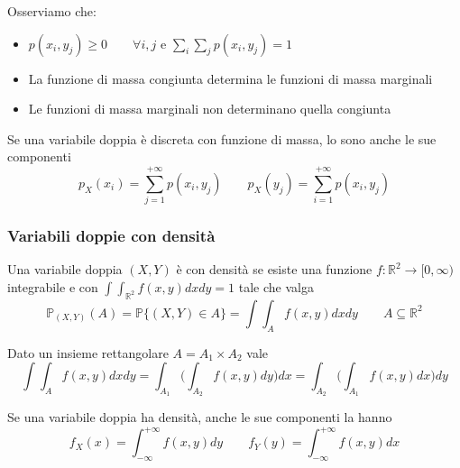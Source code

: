 \begin{observation}
	Osserviamo che:
	\begin{itemize}
		\item $p(x_i,y_j) \geq 0 \qquad \forall i,j$ e $\sum_{i}\sum_jp(x_i,y_j)=1$
		\item La funzione di massa congiunta determina le funzioni di massa marginali
		\item Le funzioni di massa marginali non determinano quella congiunta
	\end{itemize}
\end{observation}

\begin{proposition}
	Se una variabile doppia è discreta con funzione di massa, lo sono anche le sue componenti
	\begin{equation}
		p_X(x_i) = \sum_{j=1}^{+\infty} p(x_i,y_j) \quad\quad p_X(y_j) = \sum_{i=1}^{+\infty} p(x_i,y_j)
	\end{equation}
\end{proposition}
\subsubsection{Variabili doppie con densità}
Una variabile doppia $(X,Y)$ è con densità se esiste una funzione $f : \mathbb{R}^2 \to [0,\infty)$ integrabile e con $\int\int_{\mathbb{R}^2}f(x,y)dxdy=1$ tale che valga
\begin{equation}
	\mathbb{P}_{(X,Y)}(A) = \mathbb{P}\{(X,Y) \in A\} = \int\int_A f(x,y) dxdy \quad\quad A \subseteq \mathbb{R}^2
\end{equation}

\begin{theorem}
	Dato un insieme rettangolare $A = A_1 \times A_2$ vale
	\begin{equation}
		\int\int_A f(x,y)dxdy = \int_{A_1} \bigg(\int_{A_2} f(x,y)dy\bigg)dx =  \int_{A_2} \bigg(\int_{A_1} f(x,y)dx\bigg)dy 
	\end{equation}
\end{theorem}

\begin{proposition}
	Se una variabile doppia ha densità, anche le sue componenti la hanno
	\begin{equation}
		f_X(x) = \int_{-\infty}^{+\infty}f(x,y)dy \quad\quad f_Y(y) = \int_{-\infty}^{+\infty}f(x,y)dx
	\end{equation}
\end{proposition}

